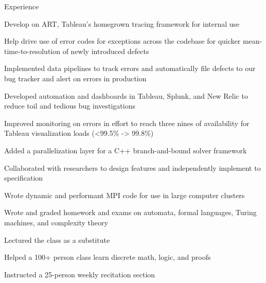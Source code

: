 \documentclass{cv}
\begin{document}

\begin{cvsection}{Experience}
  {
    \item Develop on ART, Tableau's homegrown tracing framework for internal use
    \item Help drive use of error codes for exceptions across the codebase for
        quicker mean-time-to-resolution of newly introduced defects
    \item Implemented data pipelines to track errors and automatically file
        defects to our bug tracker and alert on errors in production
    \item Developed automation and dashboards in Tableau, Splunk, and New
        Relic to reduce toil and tedious bug investigations
    \item Improved monitoring on errors in effort to reach three nines
        of availability for Tableau visualization loads (<99.5\% -> 99.8\%)
  }
  {
    \item Added a parallelization layer for a C++ branch-and-bound solver framework
    \item Collaborated with researchers to design features and independently implement to specification
    \item Wrote dynamic and performant MPI code for use in large computer clusters
  }
  {
    \item Wrote and graded homework and exams on automata, formal languages, Turing machines, and complexity theory
    \item Lectured the class as a substitute
  }
  {
    \item Helped a 100+ person class learn discrete math, logic, and proofs
    \item Instructed a 25-person weekly recitation section
  }
\end{cvsection}
\end{document}
